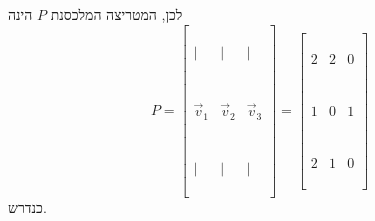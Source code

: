 \documentclass[11pt, oneside]{article}
\newcommand{\br}{\\\\\\\\\\\\\\}
\begin{document}
לכן, המטריצה המלכסנת $P$ הינה
\[
P = \begin{bmatrix}\\\\\\
\mid & \mid & \mid\br
\vec{v}_1 & \vec{v}_2 & \vec{v}_3\br
\mid & \mid & \mid
\\\\\\\end{bmatrix} = \begin{bmatrix}\\\\\\
2 & 2 & 0\br
1 & 0 & 1\br
2 & 1 & 0
\\\\\\\end{bmatrix}
\]
כנדרש.
\end{document}
